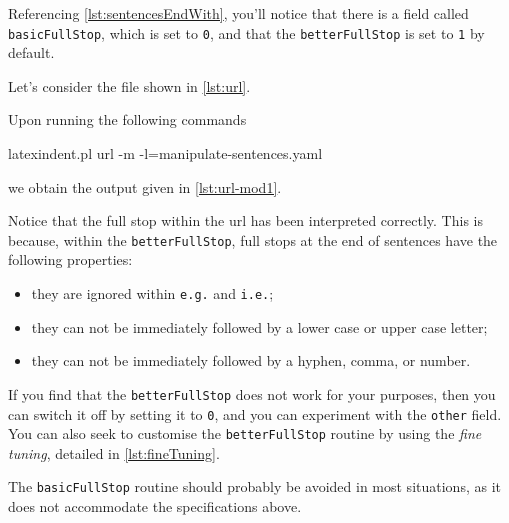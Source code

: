  Referencing \vref{lst:sentencesEndWith}, you'll notice that there is a field called
 \texttt{basicFullStop}, which is set to \texttt{0}, and that the \texttt{betterFullStop}
 is set to \texttt{1} by default.

 \begin{example}
 Let's consider the file shown in \cref{lst:url}.


 Upon running the following commands  

 \begin{commandshell}
latexindent.pl url -m -l=manipulate-sentences.yaml
\end{commandshell}

 we obtain the output given in \cref{lst:url-mod1}.


 Notice that the full stop within the url has been interpreted correctly. This is
 because, within the \texttt{betterFullStop}, full stops at the end of sentences have the
 following properties:
 \begin{itemize}
  \item they are ignored within \texttt{e.g.} and \texttt{i.e.};
  \item they can not be immediately followed by a lower case or upper case letter;
  \item they can not be immediately followed by a hyphen, comma, or number.
 \end{itemize}
 \end{example}

 If you find that the \texttt{betterFullStop} does not work for your purposes, then you
 can switch it off by setting it to \texttt{0}, and you can experiment with the
 \texttt{other} field.  You can also
 seek to customise the \texttt{betterFullStop} routine by using the \emph{fine tuning},
 detailed in \vref{lst:fineTuning}.%

 The \texttt{basicFullStop} routine should probably be avoided in most situations, as it
 does not accommodate the specifications above.

